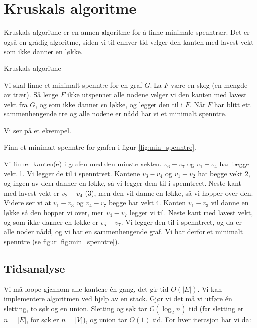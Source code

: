 \section{Kruskals algoritme}
\label{kruskal}

Kruskals algoritme er en annen algoritme for å finne minimale spenntrær. Det er også en grådig algoritme, siden vi til enhver tid velger den kanten med lavest vekt som ikke danner en løkke.

\begin{theorem} Kruskals algoritme

Vi skal finne et minimalt spenntre for en graf $ G $. La $ F $ være en skog (en mengde av trær). Så lenge $ F $ ikke utspenner alle nodene velger vi den kanten med lavest vekt fra $ G $, og som ikke danner en løkke, og legger den til i $ F $. Når $ F $ har blitt ett sammenhengende tre og alle nodene er nådd har vi et minimalt spenntre.
\end{theorem}

\noindent Vi ser på et eksempel.

\begin{example} Finn et minimalt spenntre for grafen i figur \ref{fig:min_spenntre}.

Vi finner kanten(e) i grafen med den minste vekten. $ v_6-v_7 $ og $ v_1-v_4 $ har begge vekt 1. Vi legger de til i spenntreet. Kantene $ v_3-v_4 $ og $ v_1-v_2 $ har begge vekt 2, og ingen av dem danner en løkke, så vi legger dem til i spenntreet. Neste kant med lavest vekt er $ v_2-v_4 $ (3), men den vil danne en løkke, så vi hopper over den. Videre ser vi at $ v_1-v_3 $ og $ v_4-v_7 $ begge har vekt 4. Kanten $ v_1-v_3 $ vil danne en løkke så den hopper vi over, men $ v_4-v_7 $ legger vi til. Neste kant med lavest vekt, og som ikke danner en løkke er $ v_5-v_7 $. Vi legger den til i spenntreet, og da er alle noder nådd, og vi har en sammenhengende graf. Vi har derfor et minimalt spenntre (se figur \ref{fig:min_spenntre}). 
\end{example}


\subsection{Tidsanalyse}
Vi må loope gjennom alle kantene én gang, det gir tid $ O(|E|) $. Vi kan implementere algoritmen ved hjelp av en stack. Gjør vi det må vi utføre én sletting, to søk og en union. Sletting og søk tar $ O(\log_2 n) $ tid (for sletting er $ n = |E| $, for søk er $ n = |V| $), og union tar $ O(1) $ tid. For hver iterasjon har vi da:

